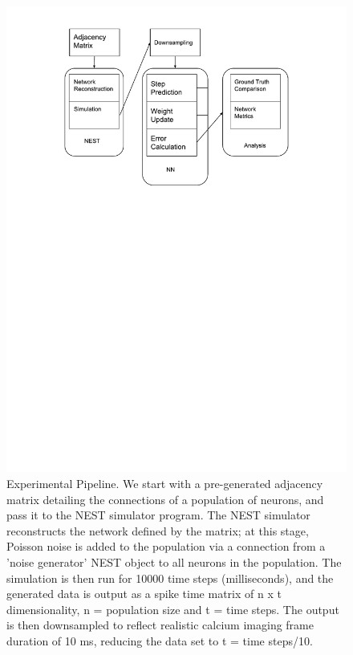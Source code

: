 \documentclass[11pt,titlepage]{article}
\begin{document}
\begin{figure}[H]
\centering
	\includegraphics[scale=0.7,trim = {0 18cm 0 1cm},clip]{./Figures/SPROJModel.pdf}
	\caption[Experimental Pipeline]{Experimental Pipeline. We start with a pre-generated adjacency matrix detailing the connections of a population of neurons, and pass it to the NEST simulator program. The NEST simulator reconstructs the network defined by the matrix; at this stage, Poisson noise is added to the population via a connection from a 'noise generator' NEST object to all neurons in the population. The simulation is then run for 10000 time steps (milliseconds), and the generated data is output as a spike time matrix of n x t dimensionality, n = population size and t = time steps. The output is then downsampled to reflect realistic calcium imaging frame duration of 10 ms, reducing the data set to t = time steps/10.}
\end{figure}
\end{document}
